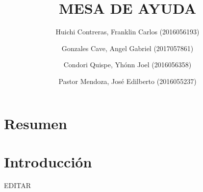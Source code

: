 \documentclass[preprint,12pt]{elsarticle}
\begin{document}
	
	\begin{frontmatter} 

		\title{\huge MESA DE AYUDA}
		
		\author{Huichi Contreras, Franklin Carlos            (2016056193)}
		\author{Gonzales Cave, Angel Gabriel              	(2017057861)}
		\author{Condori Quispe, Yhónn Joel	         	(2016056358)} 
		\author{Pastor Mendoza, José Edilberto             	(2016055237)} 
		\address{Escuela Profesional de Ingeniería de Sistemas}
		\address{Universidad Privada de Tacna}
		\address{Tacna, Perú}
		

		\begin{abstract}
		


		\end{abstract}


	\end{frontmatter}


\section{Resumen}






\section{Introducción} 

EDITAR\\



\end{document}
